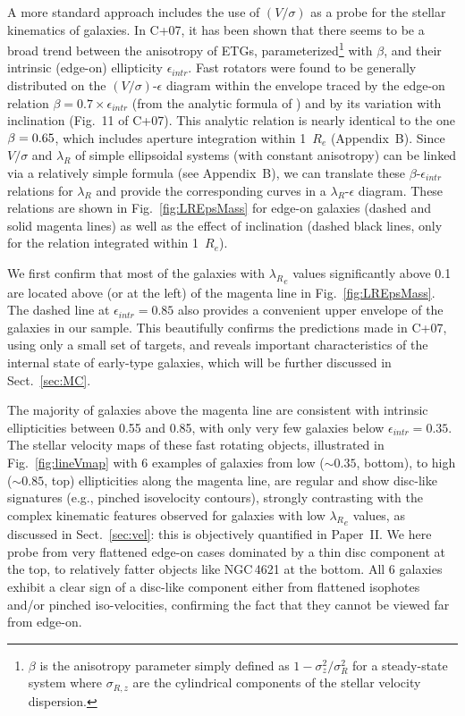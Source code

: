 \documentclass[useAMS,usenatbib,usegraphicx]{mn2e}
\begin{document}
A more standard approach includes the use of $(V/\sigma)$ as a probe for the stellar 
kinematics of galaxies. In C+07, it has been shown that there seems to be a broad trend between the anisotropy
of ETGs, parameterized\footnote{$\beta$ is the anisotropy parameter simply defined as $1 - \sigma_z^2 /
\sigma_R^2$ for a steady-state system where $\sigma_{R,z}$ are the cylindrical components 
of the stellar velocity dispersion.} with $\beta$, and their intrinsic (edge-on) ellipticity
$\epsilon_{intr}$. Fast rotators were found to be generally distributed on 
the $(V/\sigma)$-$\epsilon$ diagram within the envelope traced by the edge-on
relation $\beta = 0.7 \times \epsilon_{intr}$ (from the analytic formula of \citet{Binney05})
and by its variation with inclination (Fig.~11 of C+07).
This analytic relation is nearly identical to the one $\beta = 0.65 \time
\epsilon$, which includes aperture integration within 1~$R_e$ (Appendix~B).
Since $V/\sigma$ and $\lambda_R$ of simple ellipsoidal systems (with constant
anisotropy) can be linked via a relatively simple formula (see Appendix~B), we
can translate these $\beta$-$\epsilon_{intr}$ relations for $\lambda_R$ and provide
the corresponding curves in a $\lambda_R$-$\epsilon$ diagram.
These relations are shown in Fig.~\ref{fig:LREpsMass} for edge-on galaxies 
(dashed and solid magenta lines) as well as the effect of inclination (dashed black lines, only for 
the relation integrated within 1~$R_e$). 

We first confirm that most of the galaxies with ${\lambda_R}_e$ values significantly above 0.1
are located above (or at the left) of the magenta line in Fig.~\ref{fig:LREpsMass}.
The dashed line at $\epsilon_{intr} = 0.85$ also provides a convenient upper envelope of the
galaxies in our sample. This beautifully confirms the predictions made in C+07, using
only a small set of targets, and reveals important characteristics of the
internal state of early-type galaxies, which will be further discussed in
Sect.~\ref{sec:MC}.

The majority of galaxies above the magenta line are consistent with intrinsic ellipticities 
between 0.55 and 0.85, with only very few galaxies below $\epsilon_{intr} = 0.35$.
The stellar velocity maps of these fast rotating objects, illustrated
in Fig.~\ref{fig:lineVmap} with 6 examples of galaxies 
from low ($\sim 0.35$, bottom), to high ($\sim 0.85$, top) ellipticities along the magenta line,
are regular and show disc-like signatures (e.g., pinched isovelocity contours), strongly contrasting with the
complex kinematic features observed for galaxies with low ${\lambda_R}_e$ values, as
discussed in Sect.~\ref{sec:vel}: this is objectively quantified in Paper~II.
We here probe from very flattened edge-on cases dominated by a thin disc
component at the top, to relatively fatter objects like NGC\,4621
at the bottom. All 6 galaxies exhibit a clear sign of a disc-like component either from 
flattened isophotes and/or pinched iso-velocities, confirming the fact that they
cannot be viewed far from edge-on.
\end{document}
